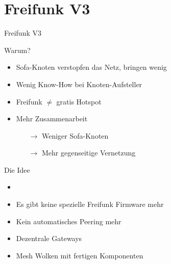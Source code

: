 \section{Freifunk V3}

\begin{frame}{}
    \begin{center}
        Freifunk V3
     \end{center}
\end{frame}

\begin{frame}{Warum?}
    \begin{itemize}
        \item \glqq{}Sofa-Knoten\grqq{} verstopfen das Netz, bringen wenig
        \item Wenig Know-How bei Knoten-Aufsteller
        \item Freifunk $\neq$ gratis Hotspot
        \item Mehr Zusammenarbeit
        \begin{itemize}
            \item[$\rightarrow$] Weniger \glqq{}Sofa-Knoten\grqq{}
            \item[$\rightarrow$] Mehr gegenseitige Vernetzung
        \end{itemize}
    \end{itemize}
\end{frame}

\begin{frame}{Die Idee}
    \begin{itemize}
        \item {}
        \item<3> Es gibt keine spezielle Freifunk Firmware mehr
        \item<3> Kein automatisches Peering mehr
        \item<3> Dezentrale Gateways
        \item<3> \glqq{}Mesh Wolken\grqq{} mit fertigen Komponenten
    \end{itemize}
\end{frame}

